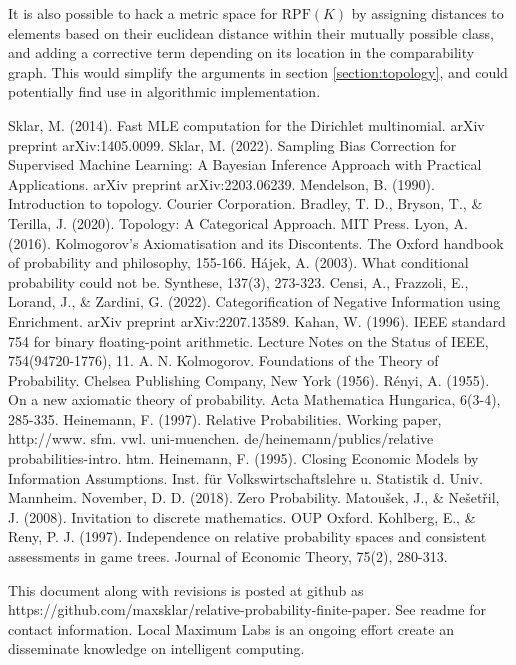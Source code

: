 \documentclass[twoside]{article}
\theoremstyle{plain}%
\theoremstyle{definition}
\theoremstyle{remark}
\begin{document}
It is also possible to hack a metric space for \(\text{RPF}(K)\) by assigning distances to elements based on their euclidean distance within their mutually possible class, and adding a corrective term depending on its location in the comparability graph. This would simplify the arguments in section \ref{section:topology}, and could potentially find use in algorithmic implementation.

\begin{thebibliography}{20}

Sklar, M. (2014). Fast MLE computation for the Dirichlet multinomial. arXiv preprint arXiv:1405.0099.
Sklar, M. (2022). Sampling Bias Correction for Supervised Machine Learning: A Bayesian Inference Approach with Practical Applications. arXiv preprint arXiv:2203.06239.
Mendelson, B. (1990). Introduction to topology. Courier Corporation.
Bradley, T. D., Bryson, T., \& Terilla, J. (2020). Topology: A Categorical Approach. MIT Press.
Lyon, A. (2016). Kolmogorov’s Axiomatisation and its Discontents. The Oxford handbook of probability and philosophy, 155-166.
Hájek, A. (2003). What conditional probability could not be. Synthese, 137(3), 273-323.
Censi, A., Frazzoli, E., Lorand, J., \& Zardini, G. (2022). Categorification of Negative Information using Enrichment. arXiv preprint arXiv:2207.13589.
Kahan, W. (1996). IEEE standard 754 for binary floating-point arithmetic. Lecture Notes on the Status of IEEE, 754(94720-1776), 11.
A. N. Kolmogorov. Foundations of the Theory of Probability. Chelsea Publishing Company, New York
(1956). 
Rényi, A. (1955). On a new axiomatic theory of probability. Acta Mathematica Hungarica, 6(3-4), 285-335.
Heinemann, F. (1997). Relative Probabilities. Working paper, http://www. sfm. vwl. uni-muenchen. de/heinemann/publics/relative probabilities-intro. htm.
Heinemann, F. (1995). Closing Economic Models by Information Assumptions. Inst. für Volkswirtschaftslehre u. Statistik d. Univ. Mannheim.
November, D. D. (2018). Zero Probability.
Matoušek, J., \& Nešetřil, J. (2008). Invitation to discrete mathematics. OUP Oxford.
Kohlberg, E., \& Reny, P. J. (1997). Independence on relative probability spaces and consistent assessments in game trees. Journal of Economic Theory, 75(2), 280-313.

\end{thebibliography}

This document along with revisions is posted at github as https://github.com/maxsklar/relative-probability-finite-paper. See readme for contact information. Local Maximum Labs is an ongoing effort create an disseminate knowledge on intelligent computing.
\end{document}
